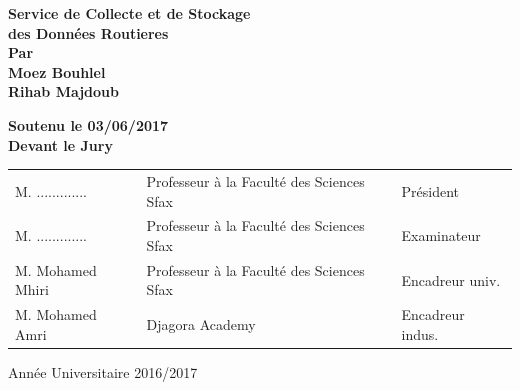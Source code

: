 \begin{titlepage}
    {\bfseries \Huge \color[RGB]{16,121,196}
        Service de Collecte et de Stockage \\ des Données Routieres
    }\\[0.3in]

    {\bfseries \large Par} \\[0.25in]

    {\bfseries \LARGE \color[RGB]{255,90,90}
        Moez Bouhlel \\
        Rihab Majdoub
    }

    \vspace{0.4in}
    {\large \bfseries
        Soutenu le 03/06/2017 \\
        Devant le Jury
    }\\[0.3in]

    \normalsize
    \bfseries
    \setlength{\tabcolsep}{10pt}
    \begin{tabular}{l l l}
        M. ............. & Professeur à la Faculté des Sciences Sfax & Président \\
        M. ............. & Professeur à la Faculté des Sciences Sfax & Examinateur \\
        M. Mohamed Mhiri & Professeur à la Faculté des Sciences Sfax & Encadreur univ. \\
        M. Mohamed Amri & Djagora Academy & Encadreur indus.
    \end{tabular}

    \vfill
    Année Universitaire 2016/2017

\end{titlepage}
\restoregeometry
